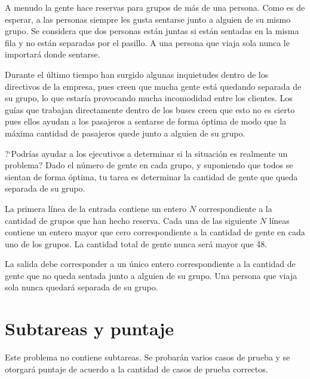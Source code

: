\documentclass{oci}
\begin{document}
\begin{problemDescription}
\begin{center}
  \end{center}
  \vspace{-9em}
  A menudo la gente hace reservas para grupos de más de una persona.
  Como es de esperar, a las personas siempre les gusta sentarse junto a alguien
  de su mismo grupo.
  Se considera que dos personas están juntas si están sentadas en la misma fila
  y no están separadas por el pasillo.
  A una persona que viaja sola nunca le importará donde sentarse.

  Durante el último tiempo han surgido algunas inquietudes dentro de los
  directivos de la empresa, pues creen que mucha gente está quedando separada de
  su grupo, lo que estaría provocando mucha incomodidad entre los clientes.
  Los guías que trabajan directamente dentro de los buses creen que esto no es
  cierto pues ellos ayudan a los pasajeros a sentarse de forma óptima de modo
  que la máxima cantidad de pasajeros quede junto a alguien de su grupo.

  ?`Podrías ayudar a los ejecutivos a determinar si la situación es realmente un
  problema?
  Dado el número de gente en cada grupo, y suponiendo que todos se sientan de
  forma óptima, tu tarea es determinar la cantidad de gente que queda separada
  de su grupo.
  
\end{problemDescription}

\begin{inputDescription}
  La primera línea de la entrada contiene un entero $N$ correspondiente a la
  cantidad de grupos que han hecho reserva.
  Cada una de las siguiente $N$ líneas contiene un entero mayor que cero
  correspondiente a la cantidad de gente en cada uno de los grupos.
  La cantidad total de gente nunca será mayor que 48.
\end{inputDescription}

\begin{outputDescription}
  La salida debe corresponder a un único entero correspondiente a la cantidad de
  gente que no queda sentada junto a alguien de su grupo.
  Una persona que viaja sola nunca quedará separada de su grupo.
\end{outputDescription}

\section*{Subtareas y puntaje}
Este problema no contiene subtareas.
Se probarán varios casos de prueba y se otorgará puntaje de acuerdo a la
cantidad de casos de prueba correctos.

\begin{sampleDescription}
\end{sampleDescription}
\end{document}
